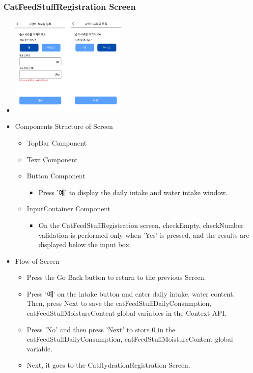 \documentclass[conference]{IEEEtran}
\begin{document}
\subsubsection{CatFeedStuffRegistration Screen}
\begin{itemize}
    \item[] \includegraphics[width=0.45\textwidth]{img/D/13.png}
    \item Components Structure of Screen
    \begin{itemize}
        \item TopBar Component
        \item Text Component
        \item Button Component
        \begin{itemize}
            \item Press '예' to display the daily intake and water intake window.
        \end{itemize}
        \item InputContainer Component
        \begin{itemize}
            \item On the CatFeedStuffRegistration screen, checkEmpty, checkNumber validation is performed only when 'Yes' is pressed, and the results are displayed below the input box.
        \end{itemize}
    \end{itemize}
    \item Flow of Screen
    \begin{itemize}
        \item Press the Go Back button to return to the previous Screen.
        \item Press ‘예’ on the intake button and enter daily intake, water content. Then, press Next to save the catFeedStuffDailyConsumption, catFeedStuffMoistureContent global variables in the Context API.
        \item Press 'No' and then press 'Next' to store 0 in the catFeedStuffDailyConsumption, catFeedStuffMoistureContent global variable.
        \item Next, it goes to the CatHydrationRegistration Screen.
    \end{itemize}
\end{itemize}
\newpage
\end{document}

